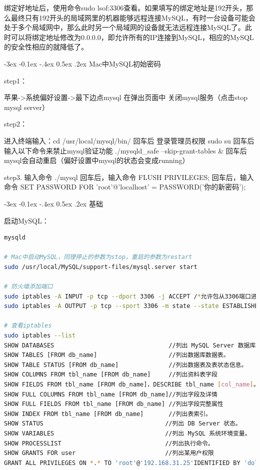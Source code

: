 \documentclass[12pt]{book}
\makeatletter
\numberwithin{dummy}{section}
\theoremstyle{ocrenumbox}
\theoremstyle{blacknumex}
\theoremstyle{blacknumbox}
\theoremstyle{ocrenum}
\renewcommand{\subsection}{\@startsection {subsection}{2}{\z@}
	{-3ex \@plus -0.1ex \@minus -.4ex}
	{0.5ex \@plus.2ex }
	{\normalfont\sffamily\bfseries}}
\makeatother
\begin{document}
绑定好地址后，使用命令sudo lsof:3306查看。如果填写的绑定地址是192开头，那么最终只有192开头的局域网里的机器能够远程连接MySQL，有时一台设备可能会处于多个局域网中，那么此时另一个局域网的设备就无法远程连接MySQL了。此时可以将绑定地址修改为0.0.0.0，即允许所有的IP连接到MySQL，相应的MySQL的安全性相应的就降低了。

\subsection{Mac中MySQL初始密码}

step1：

苹果->系统偏好设置->最下边点mysql 在弹出页面中 关闭mysql服务（点击stop mysql server）

step2：

进入终端输入：cd /usr/local/mysql/bin/
回车后 登录管理员权限 sudo su
回车后输入以下命令来禁止mysql验证功能 ./mysqld\_safe --skip-grant-tables \&
回车后mysql会自动重启（偏好设置中mysql的状态会变成running）

step3. 
输入命令 ./mysql
回车后，输入命令 FLUSH PRIVILEGES; 
回车后，输入命令 SET PASSWORD FOR 'root'@'localhost' = PASSWORD('你的新密码');

\subsection{基础}

启动MySQL：

\begin{lstlisting}[language=Bash]
mysqld

# Mac中启动MySQL，同理停止的参数为stop，重启的参数为restart
sudo /usr/local/MySQL/support-files/mysql.server start

# 防火墙添加端口
sudo iptables -A INPUT -p tcp --dport 3306 -j ACCEPT /*允许包从3306端口进入*/
sudo iptables -A OUTPUT -p tcp --sport 3306 -m state --state ESTABLISHED -j ACCEPT /*允许从3306端口进入的包返回*/

# 查看iptables
sudo iptables --list
SHOW DATABASES                                //列出 MySQL Server 数据库。
SHOW TABLES [FROM db_name]                    //列出数据库数据表。
SHOW TABLE STATUS [FROM db_name]              //列出数据表及表状态信息。
SHOW COLUMNS FROM tbl_name [FROM db_name]     //列出资料表字段
SHOW FIELDS FROM tbl_name [FROM db_name]，DESCRIBE tbl_name [col_name]。
SHOW FULL COLUMNS FROM tbl_name [FROM db_name]//列出字段及详情
SHOW FULL FIELDS FROM tbl_name [FROM db_name] //列出字段完整属性
SHOW INDEX FROM tbl_name [FROM db_name]       //列出表索引。
SHOW STATUS                                  //列出 DB Server 状态。
SHOW VARIABLES                               //列出 MySQL 系统环境变量。
SHOW PROCESSLIST                             //列出执行命令。
SHOW GRANTS FOR user                         //列出某用户权限
GRANT ALL PRIVILEGES ON *.* TO 'root'@'192.168.31.25'IDENTIFIED BY 'dolphin' WITH GRANT OPTION;
\end{lstlisting}
\end{document}
